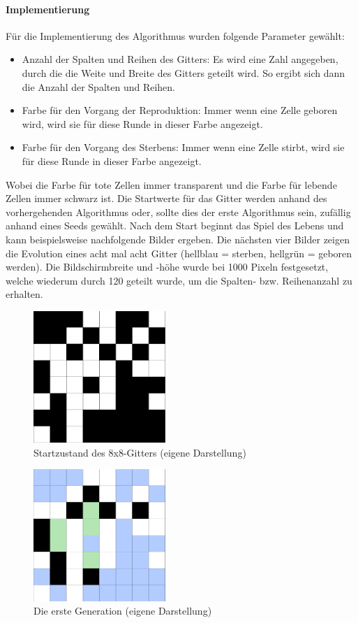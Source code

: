 \documentclass[../mciAusarbeitung.tex]{subfiles}
\begin{document}
\paragraph{Implementierung}

Für die Implementierung des Algorithmus wurden folgende Parameter gewählt:
\begin{itemize}
\item Anzahl der Spalten und Reihen des Gitters: Es wird eine Zahl angegeben, durch die die Weite und Breite des Gitters geteilt wird. So ergibt sich dann die Anzahl der Spalten und Reihen.
\item Farbe für den Vorgang der Reproduktion: Immer wenn eine Zelle geboren wird, wird sie für diese Runde in dieser Farbe angezeigt.
\item Farbe für den Vorgang des Sterbens: Immer wenn eine Zelle stirbt, wird sie für diese Runde in dieser Farbe angezeigt.
\end{itemize}
Wobei die Farbe für tote Zellen immer transparent und die Farbe für lebende Zellen immer schwarz ist. Die Startwerte für das Gitter werden anhand des vorhergehenden Algorithmus oder, sollte dies der erste Algorithmus sein, zufällig anhand eines Seeds gewählt. Nach dem Start beginnt das Spiel des Lebens und kann beispielsweise nachfolgende Bilder ergeben. Die nächsten vier Bilder zeigen die Evolution eines acht mal acht Gitter (hellblau = sterben, hellgrün = geboren werden). Die Bildschirmbreite und -höhe wurde bei 1000 Pixeln festgesetzt, welche wiederum durch 120 geteilt wurde, um die Spalten- bzw. Reihenanzahl zu erhalten.

\begin{figure}[H]
\includegraphics[width=5cm]{img/8x8_start.png}
\caption{Startzustand des 8x8-Gitters (eigene Darstellung)}
\label{8x8_start}
\end{figure}

\begin{figure}[H]
\includegraphics[width=5cm]{img/8x8_firstgen.png}
\caption{Die erste Generation (eigene Darstellung)}
\label{8x8_firstgen}
\end{figure}
\end{document}
